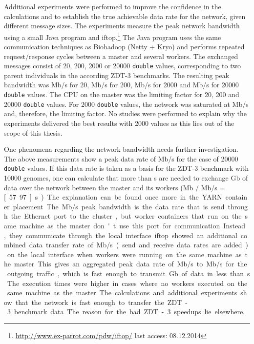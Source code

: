Additional experiments were performed to improve the confidence in the calculations and to establish the true achievable data rate for the network, given different message sizes. The experiments measure the peak network bandwidth using a small Java program and iftop.\footnote{\url{http://www.ex-parrot.com/pdw/iftop/} last access: 08.12.2014} The Java program uses the same communication techniques as Biohadoop (Netty + Kryo) and performs repeated request/response cycles between a master and several workers. The exchanged messages consist of 20, 200, 2000 or 20000 \texttt{double} values, corresponding to two parent individuals in the according ZDT-3 benchmarks. The resulting peak bandwidth was \unit[134]{Mb/s} for 20, \unit[489]{Mb/s} for 200, \unit[901]{Mb/s} for 2000 and \unit[552]{Mb/s} for 20000 \texttt{double} values. The CPU on the master was the limiting factor for 20, 200 and 20000 \texttt{double} values. For 2000 \texttt{double} values, the network was saturated at \unit[901]{Mb/s} and, therefore, the limiting factor. No studies were performed to explain why the experiments delivered the best results with 2000 values as this lies out of the scope of this thesis.

One phenomena regarding the network bandwidth needs further investigation. The above measurements show a peak data rate of \unit[552]{Mb/s} for the case of 20000 \texttt{double} values. If this data rate is taken as a basis for the ZDT-3 benchmark with 10000 genomes, one can calculate that more than \unit[55]{s} are needed to exchange \unit[32]{Gb} of data over the network between the master and its workers (\unit[32000]{Mb} / \unit[552]{Mb/s} = \unit[57.97]{s}). The explanation can be found once more in the YARN container placement. The \unit[552]{Mb/s} peak bandwidth is the data rate that is send through the Ethernet port to the cluster, but worker containers that run on the same machine as the master don't use this port for communication. Instead, they communicate through the local interface. iftop showed an additional combined data transfer rate of \unit[400]{Mb/s} (send and receive data rates are added) on the local interface when workers were running on the same machine as the master. This gives an aggregated peak data rate of \unit[700]{Mb/s} to \unit[800]{Mb/s} for the outgoing traffic, which is fast enough to transmit \unit[32]{Gb} of data in less than \unit[55]{s}. The execution times were higher in cases where no workers executed on the same machine as the master.

The calculations and additional experiments show that the network is fast enough to transfer the ZDT-3 benchmark data. The reason for the bad ZDT-3 speedups lie elsewhere.

